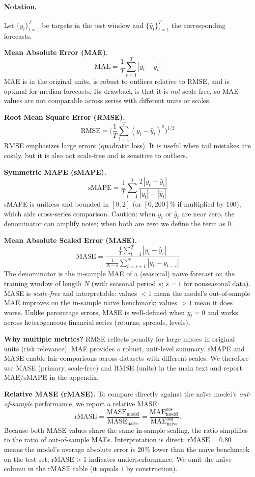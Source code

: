 \documentclass{article}
\begin{document}
\paragraph{Notation.} Let $\{y_t\}_{t=1}^T$ be targets in the test window and $\{\hat y_t\}_{t=1}^T$ the corresponding forecasts.

\medskip
\noindent\textbf{Mean Absolute Error (MAE).}
\[
\mathrm{MAE} = \frac{1}{T}\sum_{t=1}^T |y_t-\hat y_t|
\]
MAE is in the original units, is robust to outliers relative to RMSE, and is optimal for median forecasts. Its drawback is that it is \emph{not} scale-free, so MAE values are not comparable across series with different units or scales.

\medskip
\noindent\textbf{Root Mean Square Error (RMSE).}
\[
\mathrm{RMSE} = \Big(\frac{1}{T}\sum_{t=1}^T (y_t-\hat y_t)^2\Big)^{1/2}
\]
RMSE emphasizes large errors (quadratic loss). It is useful when tail mistakes are costly, but it is also not scale-free and is sensitive to outliers.

\medskip
\noindent\textbf{Symmetric MAPE (sMAPE).}
\[
\mathrm{sMAPE} = \frac{1}{T}\sum_{t=1}^T \frac{2\,|y_t-\hat y_t|}{|y_t|+|\hat y_t|}
\]
sMAPE is unitless and bounded in $[0,2]$ (or $[0,200]\%$ if multiplied by $100$), which aids cross-series comparison. Caution: when $y_t$ or $\hat y_t$ are near zero, the denominator can amplify noise; when both are zero we define the term as $0$.

\medskip
\noindent\textbf{Mean Absolute Scaled Error (MASE).}
\[
\mathrm{MASE}=\frac{\frac{1}{T}\sum_{t=1}^T |y_t-\hat y_t|}
{\displaystyle \frac{1}{N-s}\sum_{t=s+1}^{N} |y_t - y_{t-s}|}
\]
The denominator is the in-sample MAE of a (seasonal) naïve forecast on the training window of length $N$ (with seasonal period $s$; $s{=}1$ for nonseasonal data). MASE is \emph{scale-free} and interpretable: values $<1$ mean the model's out-of-sample MAE improves on the in-sample naïve benchmark; values $>1$ mean it does worse. Unlike percentage errors, MASE is well-defined when $y_t{=}0$ and works across heterogeneous financial series (returns, spreads, levels).

\medskip
\noindent\textbf{Why multiple metrics?} RMSE reflects penalty for large misses in original units (risk relevance). MAE provides a robust, unit-level summary. sMAPE and MASE enable fair comparisons across datasets with different scales. We therefore use MASE (primary, scale-free) and RMSE (units) in the main text and report MAE/sMAPE in the appendix.

\medskip
\noindent\textbf{Relative MASE (rMASE).}
To compare directly against the naïve model's \emph{out-of-sample} performance, we report a relative MASE:
\[
\mathrm{rMASE} = \frac{\mathrm{MASE}_{\text{model}}}{\mathrm{MASE}_{\text{naive}}}
= \frac{\mathrm{MAE}^{\text{oos}}_{\text{model}}}{\mathrm{MAE}^{\text{oos}}_{\text{naive}}}.
\]
Because both MASE values share the same in-sample scaling, the ratio simplifies to the ratio of out-of-sample MAEs. Interpretation is direct: $\mathrm{rMASE}=0.80$ means the model's average absolute error is $20\%$ lower than the naïve benchmark on the test set; $\mathrm{rMASE}>1$ indicates underperformance. We omit the naïve column in the rMASE table (it equals $1$ by construction).
\end{document}
